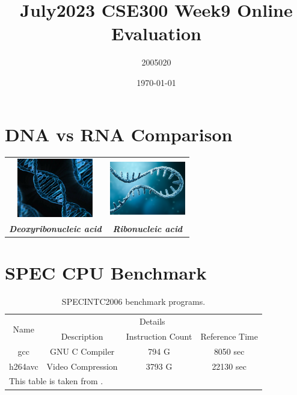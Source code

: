 \documentclass[11pt]{article}
\title{July2023 CSE300 Week9 Online Evaluation}
\author{2005020}
\date{\today}
\begin{document}
    \maketitle

\section*{DNA vs RNA Comparison} 

\begin{table}[!h]
    \centering
    \begin{tabular}{c c}
    \includegraphics{Images/DNA.png} & \includegraphics{Images/RNA.png} \\
    \textbf{\textit{Deoxyribonucleic acid}} & \textbf{\textit{Ribonucleic acid}}
    \end{tabular}
    \label{tab:my_label}
\end{table}

\section*{SPEC CPU Benchmark}

\begin{table}[!h]
\caption{SPECINTC2006 benchmark programs.}
    \centering
    \begin{tabular}{|c|c|c|c|}
    \hline
         \multirow{2}{*}{Name} &  \multicolumn{3}{|c|}{Details} \\ \cline{2-4}
         & Description & Instruction Count &  Reference Time \\ \hline
         gcc & GNU C Compiler & 794 G & 8050 sec \\ \hline
         h264avc &  Video Compression & 3793 G & 22130 sec \\ \hline   
         \multicolumn{2}{l}{This table is taken from \cite{patterson2013computer}.} &   \multicolumn{2}{l}{}
    \end{tabular}
    \label{tab:Table 1}
\end{table}
\end{document}
